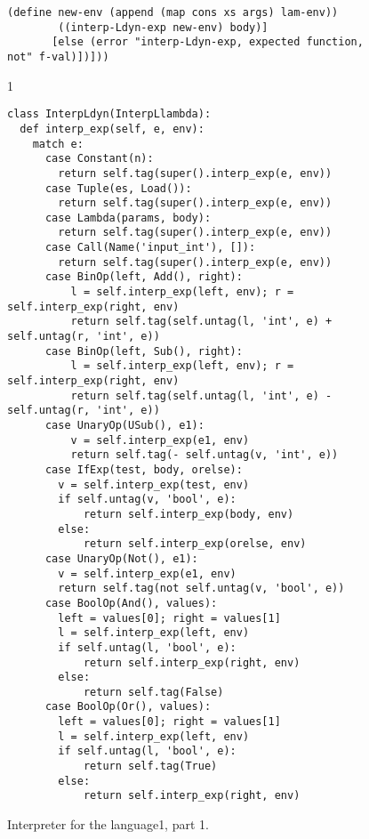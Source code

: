 \documentclass[7x10]{TimesAPriori_MIT}%
\def\pythonEd{1}
\def\edition{1}
\newcommand{\pythonColor}[0]{}
\newcommand{\python}[1]{{\if\edition\pythonEd\pythonColor #1\fi}}
\numberwithin{theorem}{chapter}
\numberwithin{definition}{chapter}
\numberwithin{equation}{chapter}
\begin{document}
\begin{figure}[tbp]
\begin{tcolorbox}[colback=white]
{\begin{lstlisting}[basicstyle=\ttfamily\footnotesize]
        (define new-env (append (map cons xs args) lam-env))
        ((interp-Ldyn-exp new-env) body)]
       [else (error "interp-Ldyn-exp, expected function, not" f-val)])]))
\end{lstlisting}
\fi}
{\if\edition\pythonEd\pythonColor
\begin{lstlisting}[basicstyle=\ttfamily\scriptsize]
class InterpLdyn(InterpLlambda):
  def interp_exp(self, e, env):
    match e:
      case Constant(n):
        return self.tag(super().interp_exp(e, env))
      case Tuple(es, Load()):
        return self.tag(super().interp_exp(e, env))
      case Lambda(params, body):
        return self.tag(super().interp_exp(e, env))
      case Call(Name('input_int'), []):
        return self.tag(super().interp_exp(e, env))
      case BinOp(left, Add(), right):
          l = self.interp_exp(left, env); r = self.interp_exp(right, env)
          return self.tag(self.untag(l, 'int', e) + self.untag(r, 'int', e))
      case BinOp(left, Sub(), right):
          l = self.interp_exp(left, env); r = self.interp_exp(right, env)
          return self.tag(self.untag(l, 'int', e) - self.untag(r, 'int', e))
      case UnaryOp(USub(), e1):
          v = self.interp_exp(e1, env)
          return self.tag(- self.untag(v, 'int', e))
      case IfExp(test, body, orelse):
        v = self.interp_exp(test, env)
        if self.untag(v, 'bool', e):
            return self.interp_exp(body, env)
        else:
            return self.interp_exp(orelse, env)
      case UnaryOp(Not(), e1):
        v = self.interp_exp(e1, env)
        return self.tag(not self.untag(v, 'bool', e))
      case BoolOp(And(), values):
        left = values[0]; right = values[1]
        l = self.interp_exp(left, env)
        if self.untag(l, 'bool', e):
            return self.interp_exp(right, env)
        else:
            return self.tag(False)
      case BoolOp(Or(), values):
        left = values[0]; right = values[1]
        l = self.interp_exp(left, env)
        if self.untag(l, 'bool', e):
            return self.tag(True)
        else:
            return self.interp_exp(right, env)
\end{lstlisting}
\fi}
  \end{tcolorbox}

  \caption{Interpreter for the \LangDyn{} language\python{, part 1}.}
\label{fig:interp-Ldyn}
\end{figure}
\end{document}

